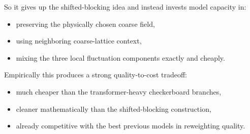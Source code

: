 \documentclass[11pt]{article}
\begin{document}
So it gives up the shifted-blocking idea and instead invests model capacity in:
\begin{itemize}
\item preserving the physically chosen coarse field,
\item using neighboring coarse-lattice context,
\item mixing the three local fluctuation components exactly and cheaply.
\end{itemize}

Empirically this produces a strong quality-to-cost tradeoff:
\begin{itemize}
\item much cheaper than the transformer-heavy checkerboard branches,
\item cleaner mathematically than the shifted-blocking construction,
\item already competitive with the best previous models in reweighting quality.
\end{itemize}
\end{document}
